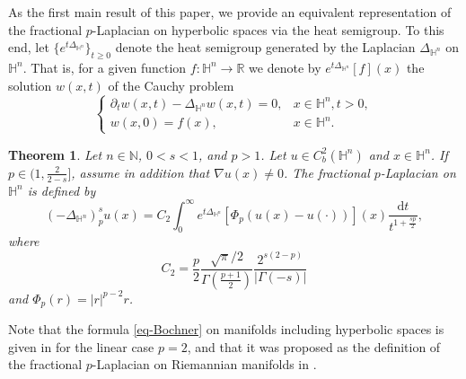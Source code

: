 \documentclass[11pt]{amsart}
\theoremstyle{plain}
\newtheorem{theorem}{Theorem}[section]
\theoremstyle{definition}
\numberwithin{equation}{section}
\begin{document}
As the first main result of this paper, we provide an equivalent representation of the fractional $p$-Laplacian on hyperbolic spaces via the heat semigroup. To this end, let $\lbrace e^{t\Delta_{\mathbb{H}^{n}}} \rbrace_{t \geq 0}$ denote the heat semigroup generated by the Laplacian $\Delta_{\mathbb{H}^{n}}$ on $\mathbb{H}^n$. That is, for a given function $f: \mathbb{H}^n \to \mathbb{R}$ we denote by $e^{t\Delta_{\mathbb{H}^{n}}}[f](x)$ the solution $w(x,t)$ of the Cauchy problem
\begin{equation} \label{eq:Cauchy}
\begin{cases}
\partial_{t} w(x,t) - \Delta_{\mathbb{H}^{n}} w(x,t) = 0, &x \in \mathbb{H}^{n}, t > 0, \\
w(x,0) = f(x), &x \in \mathbb{H}^{n}.
\end{cases}
\end{equation}

\begin{theorem}\label{thm-Bochner}
Let $n \in \mathbb{N}$, $0<s<1$, and $p > 1$. Let $u \in C^{2}_{b}(\mathbb{H}^{n})$ and $x \in \mathbb{H}^{n}$. If $p \in (1,\frac{2}{2-s}]$, assume in addition that $\nabla u(x) \neq 0$. The {\it fractional $p$-Laplacian on $\mathbb{H}^n$} is defined by
\begin{equation}\label{eq-Bochner}
(-\Delta_{\mathbb{H}^{n}})^{s}_{p} u(x) = C_{2} \int_{0}^{\infty} e^{t\Delta_{\mathbb{H}^{n}}}[ \Phi_{p}(u(x)-u(\cdot)) ](x) \frac{\mathrm{d}t}{t^{1+\frac{sp}{2}}},
\end{equation}
where
\begin{equation*}
C_{2} = \frac{p}{2} \frac{\sqrt{\pi}/2}{\Gamma(\frac{p+1}{2})} \frac{2^{s(2-p)}}{|\Gamma(-s)|}
\end{equation*}
and $\Phi_{p}(r) = |r|^{p-2}r$.
\end{theorem}

Note that the formula \eqref{eq-Bochner} on manifolds including hyperbolic spaces is given in \cite[Section~3.1]{BGS15} for the linear case $p=2$, and that it was proposed as the definition of the fractional $p$-Laplacian on Riemannian manifolds in \cite[Section~8.2]{dTGCV21}.
\end{document}
